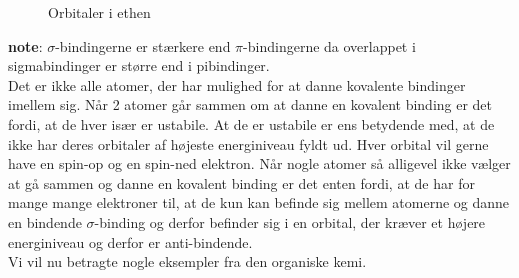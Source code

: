 \begin{wrapfigure}{r}{0.5\textwidth}
\begin{center}
\end{center}
\caption{Orbitaler i ethen \label{fig:ethen}}
\end{wrapfigure}

\textbf{note}: $\sigma$-bindingerne er stærkere end $\pi$-bindingerne da overlappet i sigmabindinger er større end i pibindinger.
\\

Det er ikke alle atomer, der har mulighed for at danne kovalente bindinger imellem sig. Når 2 atomer går sammen om at danne en kovalent binding er det fordi, at de hver især er ustabile. At de er ustabile er ens betydende med, at de ikke har deres orbitaler af højeste energiniveau fyldt ud. Hver orbital vil gerne have en spin-op og en spin-ned elektron. Når nogle atomer så alligevel ikke vælger at gå sammen og danne en kovalent binding er det enten fordi, at de har for mange mange elektroner til, at de kun kan befinde sig mellem atomerne og danne en bindende $\sigma$-binding og derfor befinder sig i en orbital, der kræver et højere energiniveau og derfor er anti-bindende. 
\\

Vi vil nu betragte nogle eksempler fra den organiske kemi.

